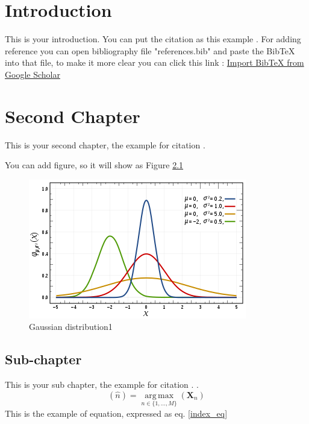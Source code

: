 \documentclass[12pt, twoside , openright]{book}
\begin{document}
\listoftables
\newpage




\mainmatter

\chapter{Introduction}
This is your introduction. You can put the citation as this example \cite{CpLi}. For adding reference you can open bibliography file "references.bib" and paste the BibTeX into that file, to make it more clear you can click this link : \href{https://www.youtube.com/watch?v=SsJSR2b4_qc&t=107s}{Import BibTeX from Google Scholar}

 \blindtext[2] %





\chapter{Second Chapter}
This is your second chapter, the example for citation \cite{Ymc}. \blindtext[1]

You can add figure, so it will show as Figure \ref{fig:figure_ref}
\begin{figure}[h]
	\centerline{\includegraphics[width=0.5\columnwidth]{Images/gambar.png}}
	\caption{Gaussian distribution1}
	\label{fig:figure_ref}
\end{figure}


\section{Sub-chapter}\label{sub_chapter}
This is your sub chapter, the example for citation \cite{latexcompanion}. \blindtext[1].
\begin{equation}
\label{index_eq}
(\hat{n})=\operatorname*{arg\,max}_{n\in \{1,\dots,M\}}(\mathbf{X}_{n})
\end{equation}
This is the example of equation, expressed as eq. \ref{index_eq}
\end{document}
